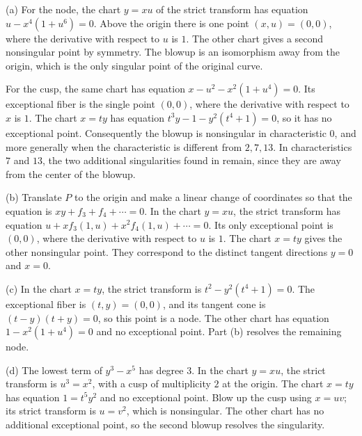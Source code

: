 (a) For the node, the chart $y=xu$ of the strict transform has equation $u-x^4(1+u^6)=0$. Above the origin there is one point $(x,u)=(0,0)$, where the derivative with respect to $u$ is $1$. The other chart gives a second nonsingular point by symmetry. The blowup is an isomorphism away from the origin, which is the only singular point of the original curve.

For the cusp, the same chart has equation $x-u^2-x^2(1+u^4)=0$. Its exceptional fiber is the single point $(0,0)$, where the derivative with respect to $x$ is $1$. The chart $x=ty$ has equation $t^3y-1-y^2(t^4+1)=0$, so it has no exceptional point. Consequently the blowup is nonsingular in characteristic $0$, and more generally when the characteristic is different from $2,7,13$. In characteristics $7$ and $13$, the two additional singularities found in  remain, since they are away from the center of the blowup.

(b) Translate $P$ to the origin and make a linear change of coordinates so that the equation is $xy+f_3+f_4+\cdots=0$. In the chart $y=xu$, the strict transform has equation $u+x f_3(1,u)+x^2f_4(1,u)+\cdots=0$. Its only exceptional point is $(0,0)$, where the derivative with respect to $u$ is $1$. The chart $x=ty$ gives the other nonsingular point. They correspond to the distinct tangent directions $y=0$ and $x=0$.

(c) In the chart $x=ty$, the strict transform is $t^2-y^2(t^4+1)=0$. The exceptional fiber is $(t,y)=(0,0)$, and its tangent cone is $(t-y)(t+y)=0$, so this point is a node. The other chart has equation $1-x^2(1+u^4)=0$ and no exceptional point. Part (b) resolves the remaining node.

(d) The lowest term of $y^3-x^5$ has degree $3$. In the chart $y=xu$, the strict transform is $u^3=x^2$, with a cusp of multiplicity $2$ at the origin. The chart $x=ty$ has equation $1=t^5y^2$ and no exceptional point. Blow up the cusp using $x=uv$; its strict transform is $u=v^2$, which is nonsingular. The other chart has no additional exceptional point, so the second blowup resolves the singularity.

